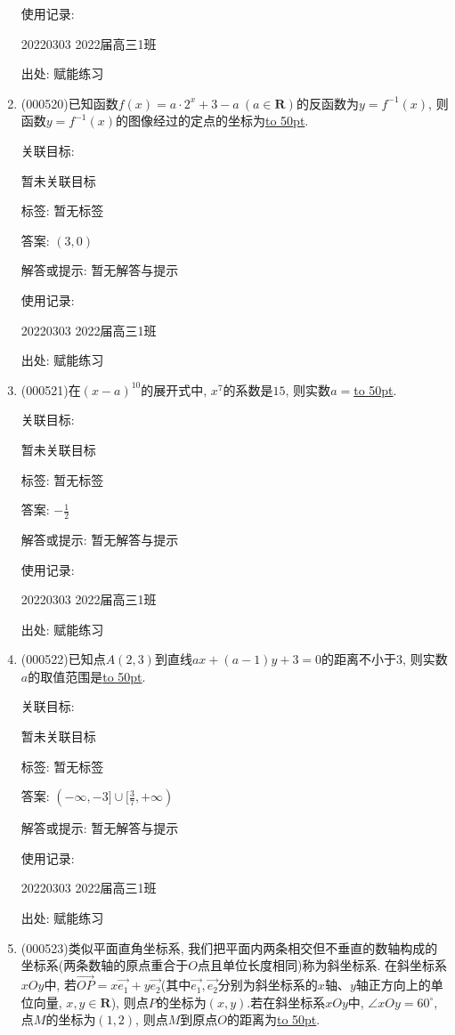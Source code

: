 \documentclass[10pt,a4paper]{article}
\newcommand{\blank}[1]{\underline{\hbox to #1pt{}}}
\begin{document}
\begin{enumerate}[1.]
使用记录:

20220303	2022届高三1班	


出处: 赋能练习
\item { (000520)}已知函数$f(x)=a\cdot 2^x+3-a\ (a\in \mathbf{R})$的反函数为$y=f^{-1}(x)$, 则函数$y=f^{-1}(x)$的图像经过的定点的坐标为\blank{50}.


关联目标:

暂未关联目标



标签: 暂无标签

答案: $(3,0)$

解答或提示: 暂无解答与提示

使用记录:

20220303	2022届高三1班	


出处: 赋能练习
\item { (000521)}在$(x-a)^{10}$的展开式中, $x^7$的系数是$15$, 则实数$a=$\blank{50}.


关联目标:

暂未关联目标



标签: 暂无标签

答案: $-\frac 12$

解答或提示: 暂无解答与提示

使用记录:

20220303	2022届高三1班	


出处: 赋能练习
\item { (000522)}已知点$A(2,3)$到直线$ax+(a-1)y+3=0$的距离不小于$3$, 则实数$a$的取值范围是\blank{50}.


关联目标:

暂未关联目标



标签: 暂无标签

答案: $(-\infty ,-3 ]\cup [ \frac 37,+\infty)$

解答或提示: 暂无解答与提示

使用记录:

20220303	2022届高三1班	


出处: 赋能练习
\item { (000523)}类似平面直角坐标系, 我们把平面内两条相交但不垂直的数轴构成的坐标系(两条数轴的原点重合于$O$点且单位长度相同)称为斜坐标系. 在斜坐标系$xOy$中, 若$\overrightarrow{OP}=x\overrightarrow{e_1}+y\overrightarrow{e_2}$(其中$\overrightarrow{e_1},\overrightarrow{e_2}$分别为斜坐标系的$x$轴、$y$轴正方向上的单位向量, $x,y\in \mathbf{R}$), 则点$P$的坐标为$(x,y)$.若在斜坐标系$xOy$中, $\angle xOy=60^\circ$, 点$M$的坐标为$(1,2)$, 则点$M$到原点$O$的距离为\blank{50}.



\end{enumerate}
\end{document}
